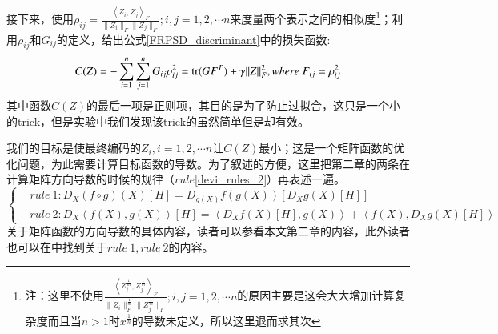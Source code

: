 接下来，使用$\rho_{ij}=\frac{\left<Z_{i},Z_{j}\right>_{F}}{\|Z_{i}\|_{F}\|Z_{j}\|_{F}};i,j=1,2,\cdots n$来度量两个表示之间的相似度\footnote{注：这里不使用$\frac{\left<Z_{i}^{\frac{1}{m}},Z_{j}^{\frac{1}{m}}\right>_{F}}{\|Z_{i}\|_{F}^{\frac{1}{m}}\|Z_{j}^{\frac{1}{m}}\|_{F}};i,j=1,2,\cdots n$的原因主要是这会大大增加计算复杂度而且当$n>1$时$x^{\frac{1}{n}}$的导数未定义，所以这里退而求其次}；利用$\rho_{ij}$和$G_{ij}$的定义，给出公式\ref{FRPSD_discriminant}中的损失函数:
\begin{equation}
\label{FRPSD_discriminant}
C(Z)=-\sum_{i=1}^{n}\sum_{j=1}^{n}G_{ij}\rho_{ij}^{2}={\rm tr}(GF^{T})+\gamma\|Z\|_{F}^{2},where~F_{ij}=\rho_{ij}^{2}
\end{equation}
其中函数$C(Z)$的最后一项是正则项，其目的是为了防止过拟合，这只是一个小的trick，但是实验中我们发现该trick的虽然简单但是却有效。

我们的目标是使最终编码的$Z_{i},i=1,2,\cdots n$让$C(Z)$最小；这是一个矩阵函数的优化问题，为此需要计算目标函数的导数。为了叙述的方便，这里把第二章的两条在计算矩阵方向导数的时候的规律（$rule$\ref{devi_rules_2}）再表述一遍。
\begin{displaymath}
\label{devi_rules}
\left\{
\begin{split}
&rule~1:D_{X}(f\circ g)(X)[H]=D_{g(X)}f(g(X))[D_{X}g(X)[H]]\\
&rule~2:D_{X}\left<f(X),g(X)\right>[H]=\left<D_{X}f(X)[H],g(X)\right>+\left<f(X),D_{X}g(X)[H]\right>
\end{split}
\right.
\end{displaymath}
关于矩阵函数的方向导数的具体内容，读者可以参看本文第二章的内容，此外读者也可以在\cite{Maniopt_DiscreteCurveFitting}中找到关于$rule~1,rule~2$的内容。

